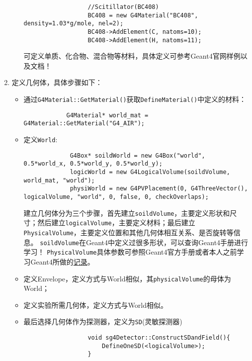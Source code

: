 \documentclass{article}
\begin{document}
\begin{enumerate}
\begin{itemize}
\begin{lstlisting}
                  //Scitillator(BC408)
                  BC408 = new G4Material("BC408", density=1.03*g/mole, nel=2);
                  BC408->AddElement(C, natoms=10);
                  BC408->AddElement(H, natoms=11);
              \end{lstlisting}
                    可定义单质、化合物、混合物等材料，具体定义可参考Geant4官网样例以及文档！
          \end{itemize}
    \item 定义几何体，具体步骤如下：
          \begin{itemize}
              \item 通过\texttt{G4Material::GetMaterial()}获取\texttt{DefineMaterial()}中定义的材料：
                    \begin{lstlisting}
            G4Material* world_mat =  G4Material::GetMaterial("G4_AIR");
        \end{lstlisting}
              \item 定义\texttt{World}:
                    \begin{lstlisting}
             G4Box* soildWorld = new G4Box("world", 0.5*world_x, 0.5*world_y, 0.5*world_y);
             logicWorld = new G4LogicalVolume(soildVolume, world_mat, "world");
             physiWorld = new G4PVPlacement(0, G4ThreeVector(), logicalVolume, "world", 0, false, 0, checkOverlaps);
        \end{lstlisting}
                    建立几何体分为三个步骤，首先建立\texttt{soildVolume}，主要定义形状和尺寸；然后建立\texttt{logicalVolume}，主要定义材料；最后建立\texttt{PhysicalVolume}，主要定义位置和其他几何体相互关系、是否旋转等信息。
                    \newline
                    \texttt{soildVolume}在Geant4中定义过很多形状，可以查询Geant4手册进行学习！
                    \newline
                    \texttt{PhysicalVolume}具体参数可参照Geant4官方手册或者本人之前学习Geant4所做的\href{https://github.com/iuming/Geant4_Learning/blob/16f8670a6f606cbc0eca1225a81669e54e42594a/example/B1/src/B1DetectorConstruction.cc#L90}{记录}。
              \item 定义Envelope，定义方式与World相似，其\texttt{physicalVolume}的母体为World；
              \item 定义实验所需几何体，定义方式与World相似。
              \item 最后选择几何体作为探测器，定义为\texttt{SD}(灵敏探测器)
                    \begin{lstlisting}
                  void sg4Detector::ConstructSDandField(){
                      DefineOneSD(<logicalVolume>);
                  }
              \end{lstlisting}
          \end{itemize}
\end{enumerate}
\end{document}
